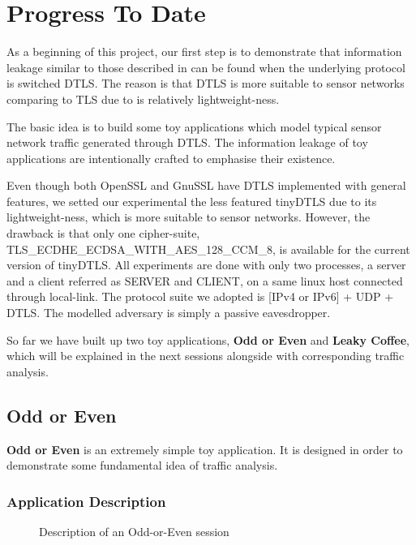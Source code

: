 \chapter{Progress To Date}
\label{Chp: Progress To Date}

As a beginning of this project, our first step is to demonstrate that information leakage similar to those described in \cite{Web1} can be found when the underlying protocol is switched DTLS. The reason is that DTLS is more suitable to sensor networks comparing to TLS due to is relatively lightweight-ness. 

The basic idea is to build some toy applications which model typical sensor network traffic generated through DTLS. The information leakage of toy applications are intentionally crafted to emphasise their existence.

Even though both OpenSSL and GnuSSL have DTLS implemented with general features, we setted our experimental the less featured tinyDTLS\cite{tinyDTLS} due to its lightweight-ness, which is more suitable to sensor networks. However, the drawback is that only one cipher-suite, TLS\_ECDHE\_ECDSA\_WITH\_AES\_128\_CCM\_8\cite{rfc7251}, is available for the current version of tinyDTLS. All experiments are done with only two processes, a server and a client referred as SERVER and CLIENT, on a same linux host connected through local-link. The protocol suite we adopted is [IPv4 or IPv6] + UDP + DTLS. The modelled adversary is simply a passive eavesdropper.

So far we have built up two toy applications, \textbf{Odd or Even} and \textbf{Leaky Coffee}, which will be explained in the next sessions alongside with corresponding traffic analysis.

\section{Odd or Even}
\textbf{Odd or Even} is an extremely simple toy application. It is designed in order to demonstrate some fundamental idea of traffic analysis.

\subsection{Application Description}

\begin{figure}[H] 
\centering
\resizebox{8cm}{!}
{}
\caption{Description of an Odd-or-Even session}
\label{Fig: Odd or Even}
\end{figure}

